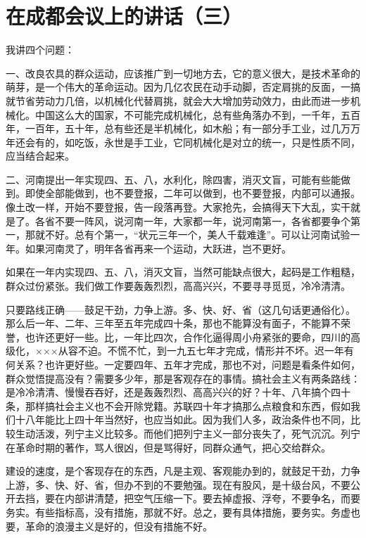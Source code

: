 \section[在成都会议上的讲话（三）（一九五八年三月二十日）]{在成都会议上的讲话（三）}


我讲四个问题：

一、改良农具的群众运动，应该推广到一切地方去，它的意义很大，是技术革命的萌芽，是一个伟大的革命运动。因为几亿农民在动手动脚，否定肩挑的反面，一搞就节省劳动力几倍，以机械化代替肩挑，就会大大增加劳动效力，由此而进一步机械化。中国这么大的国家，不可能完成机械化，总有些角落办不到，一千年，五百年，一百年，五十年，总有些还是半机械化，如木船；有一部分手工业，过几万万年还会有的，如吃饭，永世是手工业，它同机械化是对立的统一，只是性质不同，应当结合起来。

二、河南提出一年实现四、五、八，水利化，除四害，消灭文盲，可能有些能做到。即使全部能做到，也不要登报，二年可以做到，也不要登报，内部可以通报。像土改一样，开始不要登报，告一段落再登。大家抢先，会搞得天下大乱，实干就是了。各省不要一阵风，说河南一年，大家都一年，说河南第一，各省都要争个第一，那就不好。总有个第一，“状元三年一个，美人千载难逢”。可以让河南试验一年。如果河南灵了，明年各省再来一个运动，大跃进，岂不更好。

如果在一年内实现四、五、八，消灭文盲，当然可能缺点很大，起码是工作粗糙，群众过份紧张。我们做工作要轰轰烈烈，高高兴兴，不要寻寻觅觅，冷冷清清。

只要路线正确——鼓足干劲，力争上游。多、快、好、省（这几句话更通俗化）。那么后一年、二年、三年至五年完成四十条，那也不能算没有面子，不能算不荣誉，也许还更好一些。比，一年比四次，合作化逼得周小舟紧张的要命，四川的高级化，×××从容不迫。不慌不忙，到一九五七年才完成，情形并不坏。迟一年有何关系？也许更好些。一定要四年、五年才完成，那也不对，问题是看条件如何，群众觉悟提高没有？需要多少年，那是客观存在的事情。搞社会主义有两条路线：是冷冷清清、慢慢吞吞好，还是轰轰烈烈、高高兴兴的好？十年、八年搞个四十条，那样搞社会主义也不会开除党籍。苏联四十年才搞那么点粮食和东西，假如我们十八年能比上四十年当然好，也应当如此。因为我们人多，政治条件也不同，比较生动活泼，列宁主义比较多。而他们把列宁主义一部分丧失了，死气沉沉。列宁在革命时期的著作，骂人很凶，但是骂得好，同群众通气，把心交给群众。

建设的速度，是个客现存在的东西，凡是主观、客观能办到的，就鼓足干劲，力争上游，多、快、好、省，但办不到的不要勉强。现在有股风，是十级台风，不要公开去挡，要在内部讲清楚，把空气压缩一下。要去掉虚报、浮夸，不要争名，而要务实。有些指标高，没有措施，那就不好。总之，要有具体措施，要务实。务虚也要，革命的浪漫主义是好的，但没有措施不好。

